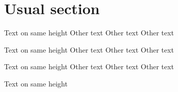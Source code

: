 \documentclass{kapital}
\begin{document}
  \tableofcontents*
  \mainmatter

  \section{Usual section}

  Text on same height
  \clearpage
  Other text
    \clearpage
  Other text
    \clearpage
  Other text


  Text on same height
  \clearpage
  Other text
    \clearpage
  Other text
    \clearpage
  Other text



  Text on same height
  \clearpage
  Other text
    \clearpage
  Other text
    \clearpage
  Other text


  \noindent{}Text on same height








\end{document}
